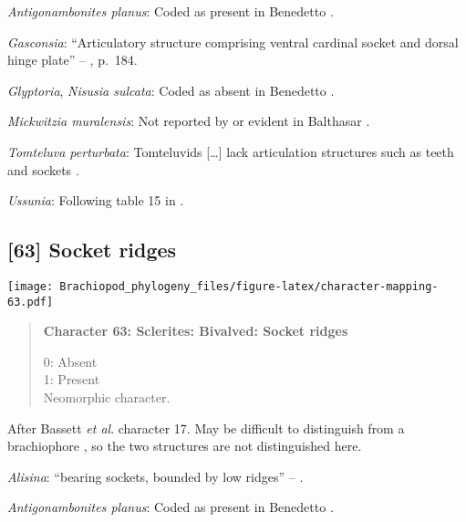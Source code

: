 \documentclass[openany]{book}
\theoremstyle{definition}
\theoremstyle{definition}
\theoremstyle{definition}
\theoremstyle{remark}
\begin{document}
\hypertarget{Antigonambonites_planus-coding-62}{}
\emph{Antigonambonites planus}: Coded as present in Benedetto
\citeyearpar{Benedetto2009iChaniella}.

\hypertarget{Gasconsia-coding-62}{}
\emph{Gasconsia}: ``Articulatory structure comprising ventral cardinal
socket and dorsal hinge plate'' --
\citet{Williams2000LinguliformeaCraniiformea}, p.~184.

\hypertarget{Glyptoria-coding-62}{}
\emph{Glyptoria}, \emph{Nisusia sulcata}: Coded as absent in Benedetto
\citeyearpar{Benedetto2009iChaniella}.

\hypertarget{Mickwitzia_muralensis-coding-62}{}
\emph{Mickwitzia muralensis}: Not reported by or evident in Balthasar
\citeyearpar{Balthasar2004Shellstructure}.

\hypertarget{Tomteluva_perturbata-coding-62}{}
\emph{Tomteluva perturbata}: Tomteluvids {[}\ldots{}{]} lack
articulation structures such as teeth and sockets
\citep{Streng2016Anew}.

\hypertarget{Ussunia-coding-62}{}
\emph{Ussunia}: Following table 15 in
\citet{Williams2000LinguliformeaCraniiformea}.

\subsection*{{[}63{]} Socket ridges}\label{socket-ridges}

\texttt{[image: Brachiopod\_phylogeny\_files/figure-latex/character-mapping-63.pdf]}

\begin{quote}
\textbf{Character 63: Sclerites: Bivalved: Socket ridges}

0: Absent\\
1: Present\\
Neomorphic character.
\end{quote}

After Bassett \emph{et al}.
\citeyearpar{Bassett2001Functionalmorphology} character 17. May be
difficult to distinguish from a brachiophore \citep[see Fig 323
in][]{Williams1997Introduction}, so the two structures are not
distinguished here.

\hypertarget{Alisina-coding-63}{}
\emph{Alisina}: ``bearing sockets, bounded by low ridges'' --
\citet{Williams2000LinguliformeaCraniiformea}.

\hypertarget{Antigonambonites_planus-coding-63}{}
\emph{Antigonambonites planus}: Coded as present in Benedetto
\citeyearpar{Benedetto2009iChaniella}.
\end{document}
